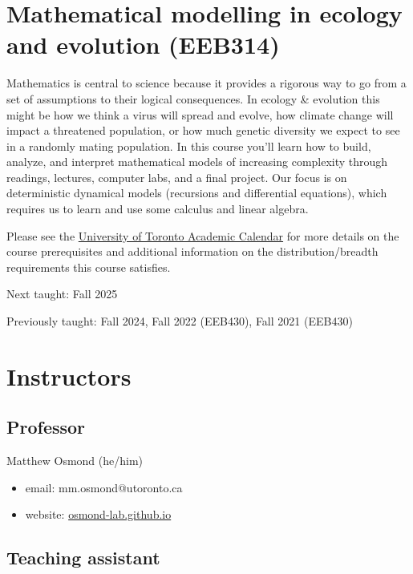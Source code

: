 \documentclass[
]{article}
\author{}
\date{}
\providecommand{\tightlist}{%
  \setlength{\itemsep}{0pt}\setlength{\parskip}{0pt}}
\begin{document}
\section{Mathematical modelling in ecology and evolution (EEB314)}

Mathematics is central to science because it provides a rigorous way to
go from a set of assumptions to their logical consequences. In ecology
\& evolution this might be how we think a virus will spread and evolve,
how climate change will impact a threatened population, or how much
genetic diversity we expect to see in a randomly mating population. In
this course you'll learn how to build, analyze, and interpret
mathematical models of increasing complexity through readings, lectures,
computer labs, and a final project. Our focus is on deterministic
dynamical models (recursions and differential equations), which requires
us to learn and use some calculus and linear algebra.

Please see the
\href{https://artsci.calendar.utoronto.ca/course/eeb314h1}{University of
Toronto Academic Calendar} for more details on the course prerequisites
and additional information on the distribution/breadth requirements this
course satisfies.

Next taught: Fall 2025

Previously taught: Fall 2024, Fall 2022 (EEB430), Fall 2021 (EEB430)

\section{Instructors}\label{instructors}

\subsection{Professor}\label{professor}

Matthew Osmond (he/him)

\begin{itemize}
\tightlist
\item
  email: mm.osmond@utoronto.ca
\item
  website: \href{https://osmond-lab.github.io/}{osmond-lab.github.io}
\end{itemize}

\subsection{Teaching assistant}\label{teaching-assistant}
\end{document}
